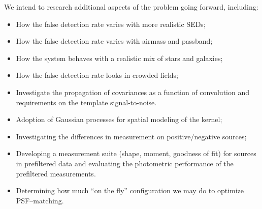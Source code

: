 \documentclass[prd, nofootinbib, floatfix, 11pt,tightenlines,times]{article}
\begin{document}
We intend to research additional aspects of the problem going forward,
including:
\begin{itemize}
\item How the false detection rate varies with more realistic SEDs;
\item How the false detection rate varies with airmass and passband;
\item How the system behaves with a realistic mix of stars and galaxies;
\item How the false detection rate looks in crowded fields;
\item Investigate the propagation of covariances as a function of
  convolution and requirements on the template signal-to-noise.
\item Adoption of Gaussian processes for spatial modeling of the kernel;
\item Investigating the differences in measurement on positive/negative sources;
\item Developing a measurement suite (shape, moment, goodness of fit)
  for sources in prefiltered data and evaluating the photometric
  performance of the prefiltered measurements.
\item Determining how much ``on the fly'' configuration we may do to optimize PSF--matching.
\end{itemize}
\end{document}

